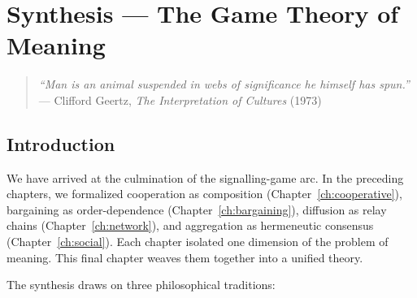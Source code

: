 \chapter{Synthesis --- The Game Theory of Meaning}
\label{ch:synthesis}

\begin{quote}
\textit{``Man is an animal suspended in webs of significance he himself has
spun.''}\\
--- Clifford Geertz, \textit{The Interpretation of Cultures} (1973)
\end{quote}

\vspace{1em}

\section{Introduction}

We have arrived at the culmination of the signalling-game arc.  In the
preceding chapters, we formalized cooperation as composition
(Chapter~\ref{ch:cooperative}), bargaining as order-dependence
(Chapter~\ref{ch:bargaining}), diffusion as relay chains
(Chapter~\ref{ch:network}), and aggregation as hermeneutic consensus
(Chapter~\ref{ch:social}).  Each chapter isolated one dimension of the
problem of meaning.  This final chapter weaves them together into a unified
theory.

The synthesis draws on three philosophical traditions:

